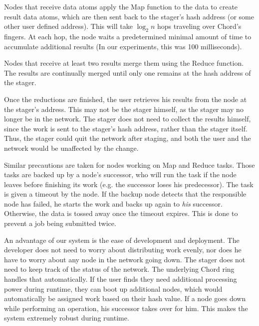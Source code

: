 \documentclass[10pt, conference, compsocconf]{IEEEtran}
\begin{document}
Nodes that receive data atoms apply the Map function to the data to create result data atoms, which are then sent back to the stager's hash address (or some other user defined address).  This will take $\log_{2} n$ hops traveling over Chord's fingers.  At each hop, the node waits a predetermined minimal amount of time to accumulate additional results (In our experiments, this was 100 milliseconds).

Nodes that receive at least two results merge them using the Reduce function.  The results are continually merged until only one remains at the hash address of the stager. 

Once the reductions are finished, the user retrieves his results from the node at the stager's address.  This may not be the stager himself, as the stager may no longer be in the network.  The stager does not need to collect the results himself, since the work is sent to the stager's hash address, rather than the stager itself.  Thus, the stager could quit the network after staging, and both the user and the network would be unaffected by the change. %

Similar precautions are taken for nodes working on Map and Reduce tasks.  Those tasks are backed up by a node's successor, who will run the task if the node leaves before finishing its work (e.g. the successor loses his predecessor).   The task is given a timeout by the node.  If the backup node detects that the responsible node has failed, he starts the work and backs up again to \emph{his} successor.  Otherwise, the data is tossed away once the timeout expires. This is done to prevent a job being submitted twice.

An advantage of our system is the ease of development and deployment.  The developer does not need to worry about distributing work evenly, nor does he have to worry about any node in the network going down.  The stager does not need to keep track of the status of the network.  The underlying Chord ring handles that automatically.  If the user finds they need additional processing power during runtime, they can boot up additional nodes, which would automatically be assigned work based on their hash value.   If a node goes down while performing an operation, his successor takes over for him.  This makes the system extremely robust during runtime.
\end{document}
